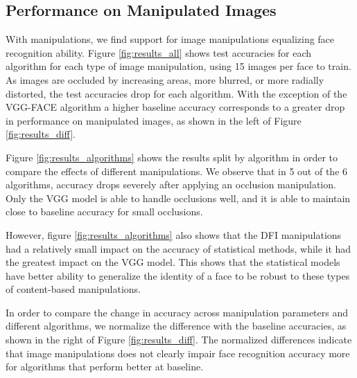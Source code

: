 \documentclass[pageno]{cos429}
\begin{document}
\subsection*{Performance on Manipulated Images}
With manipulations, we find support for image manipulations equalizing face recognition ability. Figure \ref{fig:results_all} shows test accuracies for each algorithm for each type of image manipulation, using 15 images per face to train. As images are occluded by increasing areas, more blurred, or more radially distorted, the test accuracies drop for each algorithm. With the exception of the VGG-FACE algorithm a higher baseline accuracy corresponds to a greater drop in performance on manipulated images, as shown in the left of Figure \ref{fig:results_diff}.

Figure \ref{fig:results_algorithms} shows the results split by algorithm in order to compare the effects of different manipulations. We observe that in 5 out of the 6 algorithms, accuracy drops severely after applying an occlusion manipulation. Only the VGG model is able to handle occlusions well, and it is able to maintain close to baseline accuracy for small occlusions.

However, figure \ref{fig:results_algorithms} also shows that the DFI manipulations had a relatively small impact on the accuracy of statistical methods, while it had the greatest impact on the VGG model. This shows that the statistical models have better ability to generalize the identity of a face to be robust to these types of content-based manipulations.

In order to compare the change in accuracy across manipulation parameters and different algorithms, we normalize the difference with the baseline accuracies, as shown in the right of Figure \ref{fig:results_diff}. The normalized differences indicate that image manipulations does not clearly impair face recognition accuracy more for algorithms that perform better at baseline.
\end{document}
